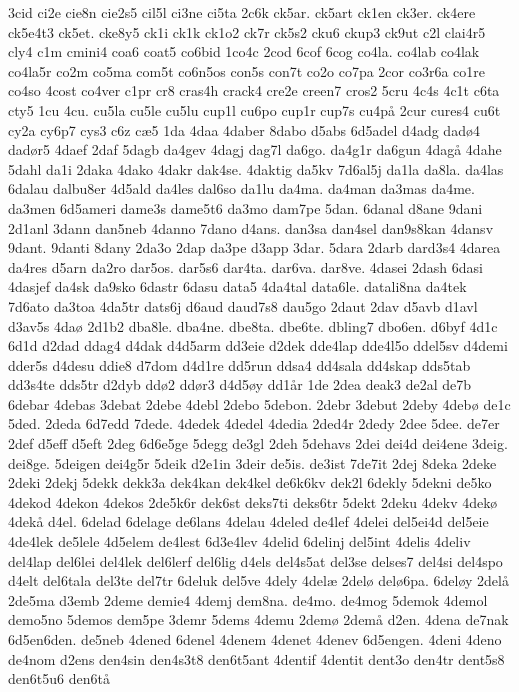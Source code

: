 {3cid
ci2e
cie8n
cie2s5
cil5l
ci3ne
ci5ta
2c6k
ck5ar.
ck5art
ck1en
ck3er.
ck4ere
ck5e4t3
ck5et.
cke8y5
ck1i
ck1k
ck1o2
ck7r
ck5s2
cku6
ckup3
ck9ut
c2l
clai4r5
cly4
c1m
cmini4
coa6
coat5
co6bid
1co4c
2cod
6cof
6cog
co4la.
co4lab
co4lak
co4la5r
co2m
co5ma
com5t
co6n5os
con5s
con7t
co2o
co7pa
2cor
co3r6a
co1re
co4so
4cost
co4ver
c1pr
cr8
cras4h
crack4
cre2e
creen7
cros2
5cru
4c4s
4c1t
c6ta
cty5
1cu
4cu.
cu5la
cu5le
cu5lu
cup1l
cu6po
cup1r
cup7s
cu4på
2cur
cures4
cu6t
cy2a
cy6p7
cys3
c6z
cæ5
1da
4daa
4daber
8dabo
d5abs
6d5adel
d4adg
dadø4
dadør5
4daef
2daf
5dagb
da4gev
4dagj
dag7l
da6go.
da4g1r
da6gun
4dagå
4dahe
5dahl
da1i
2daka
4dako
4dakr
dak4se.
4daktig
da5kv
7d6al5j
da1la
da8la.
da4las
6dalau
dalbu8er
4d5ald
da4les
dal6so
da1lu
da4ma.
da4man
da3mas
da4me.
da3men
6d5ameri
dame3s
dame5t6
da3mo
dam7pe
5dan.
6danal
d8ane
9dani
2d1anl
3dann
dan5neb
4danno
7dano
d4ans.
dan3sa
dan4sel
dan9s8kan
4dansv
9dant.
9danti
8dany
2da3o
2dap
da3pe
d3app
3dar.
5dara
2darb
dard3s4
4darea
da4res
d5arn
da2ro
dar5os.
dar5s6
dar4ta.
dar6va.
dar8ve.
4dasei
2dash
6dasi
4dasjef
da4sk
da9sko
6dastr
6dasu
data5
4da4tal
data6le.
datali8na
da4tek
7d6ato
da3toa
4da5tr
dats6j
d6aud
daud7s8
dau5go
2daut
2dav
d5avb
d1avl
d3av5s
4daø
2d1b2
dba8le.
dba4ne.
dbe8ta.
dbe6te.
dbling7
dbo6en.
d6byf
4d1c
6d1d
d2dad
ddag4
d4dak
d4d5arm
dd3eie
d2dek
dde4lap
dde4l5o
ddel5sv
d4demi
dder5s
d4desu
ddie8
d7dom
d4d1re
dd5run
ddsa4
dd4sala
dd4skap
dds5tab
dd3s4te
dds5tr
d2dyb
ddø2
ddør3
d4d5øy
dd1år
1de
2dea
deak3
de2al
de7b
6debar
4debas
3debat
2debe
4debl
2debo
5debon.
2debr
3debut
2deby
4debø
de1c
5ded.
2deda
6d7edd
7dede.
4dedek
4dedel
4dedia
2ded4r
2dedy
2dee
5dee.
de7er
2def
d5eff
d5eft
2deg
6d6e5ge
5degg
de3gl
2deh
5dehavs
2dei
dei4d
dei4ene
3deig.
dei8ge.
5deigen
dei4g5r
5deik
d2e1in
3deir
de5is.
de3ist
7de7it
2dej
8deka
2deke
2deki
2dekj
5dekk
dekk3a
dek4kan
dek4kel
de6k6kv
dek2l
6dekly
5dekni
de5ko
4dekod
4dekon
4dekos
2de5k6r
dek6st
deks7ti
deks6tr
5dekt
2deku
4dekv
4dekø
4dekå
d4el.
6delad
6delage
de6lans
4delau
4deled
de4lef
4delei
del5ei4d
del5eie
4de4lek
de5lele
4d5elem
de4lest
6d3e4lev
4delid
6delinj
del5int
4delis
4deliv
del4lap
del6lei
del4lek
del6lerf
del6lig
d4els
del4s5at
del3se
delses7
del4si
del4spo
d4elt
del6tala
del3te
del7tr
6deluk
del5ve
4dely
4delæ
2delø
delø6pa.
6deløy
2delå
2de5ma
d3emb
2deme
demie4
4demj
dem8na.
de4mo.
de4mog
5demok
4demol
demo5no
5demos
dem5pe
3demr
5dems
4demu
2demø
2demå
d2en.
4dena
de7nak
6d5en6den.
de5neb
4dened
6denel
4denem
4denet
4denev
6d5engen.
4deni
4deno
de4nom
d2ens
den4sin
den4s3t8
den6t5ant
4dentif
4dentit
dent3o
den4tr
dent5s8
den6t5u6
den6tå
}
